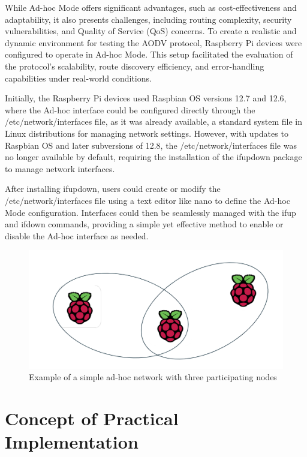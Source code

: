 \documentclass[]{nsm-thesis}
\begin{document}
While Ad-hoc Mode offers significant advantages, such as cost-effectiveness and adaptability, it also presents challenges, including routing complexity, security vulnerabilities, and Quality of Service (QoS) concerns. To create a realistic and dynamic environment for testing the AODV protocol, Raspberry Pi devices were configured to operate in Ad-hoc Mode. This setup facilitated the evaluation of the protocol’s scalability, route discovery efficiency, and error-handling capabilities under real-world conditions.

Initially, the Raspberry Pi devices used Raspbian OS versions 12.7 and 12.6, where the Ad-hoc interface could be configured directly through the /etc/network/interfaces file, as it was already available, a standard system file in Linux distributions for managing network settings. However, with updates to Raspbian OS and later subversions of 12.8, the /etc/network/interfaces file was no longer available by default, requiring the installation of the ifupdown package to manage network interfaces.

After installing ifupdown, users could create or modify the /etc/network/interfaces file using a text editor like nano to define the Ad-hoc Mode configuration. Interfaces could then be seamlessly managed with the ifup and ifdown commands, providing a simple yet effective method to enable or disable the Ad-hoc interface as needed.



\begin{figure}[h]
\graphicspath{{/image/}} %
\centering
\includegraphics[scale=0.4]{image/Adhoc.png} %
\caption{Example of a simple ad-hoc network with three participating nodes}
\label{fig:mesh7} %
\end{figure}

\chapter{Concept of Practical Implementation}
\end{document}
